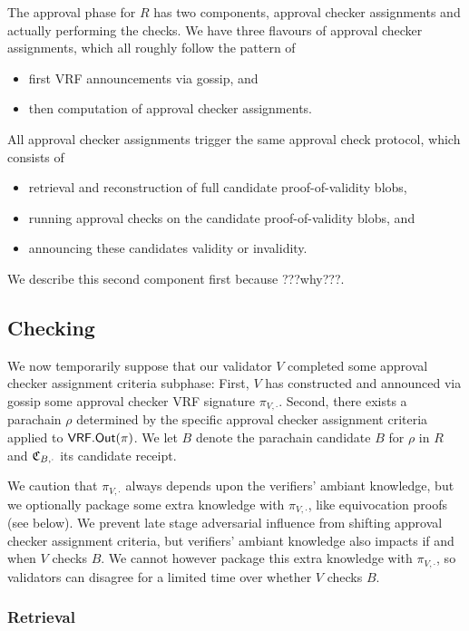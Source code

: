 The approval phase for $R$ has two components, approval checker assignments and actually performing the checks.  We have three flavours of approval checker assignments, which all roughly follow the pattern of
\begin{itemize}
\item first VRF announcements via gossip, and
\item then computation of approval checker assignments.
\end{itemize}
\noindent 
All approval checker assignments trigger the same approval check protocol, which consists of
\begin{itemize}
\item retrieval and reconstruction of full candidate proof-of-validity blobs, 
\item running approval checks on the candidate proof-of-validity blobs, and 
\item announcing these candidates validity or invalidity.
\end{itemize}
We describe this second component first because ???why???.


\subsection{Checking}
\label{sec:approcal_checks}

We now temporarily suppose that our validator $V$ completed some approval checker assignment criteria subphase:  First, $V$ has constructed and announced via gossip some approval checker VRF signature $\pi_{V,\cdot}$.  Second, there exists a parachain $\rho$ determined by the specific approval checker assignment criteria applied to $\mathsf{VRF}.\mathsf{Out}(\pi)$.  We let $B$ denote the parachain candidate $B$ for $\rho$ in $R$ and $\mathfrak{C}_{B,\cdot}$ its candidate receipt.  

We caution that $\pi_{V,\cdot}$ always depends upon the verifiers' ambiant knowledge, but we optionally package some extra knowledge with $\pi_{V,\cdot}$, like equivocation proofs (see below).  We prevent late stage adversarial influence from shifting approval checker assignment criteria, but verifiers' ambiant knowledge also impacts if and when $V$ checks $B$.  We cannot however package this extra knowledge with $\pi_{V,\cdot}$, so validators can disagree for a limited time over whether $V$ checks $B$.

\subsubsection{Retrieval}
\label{sec:retrieval}

